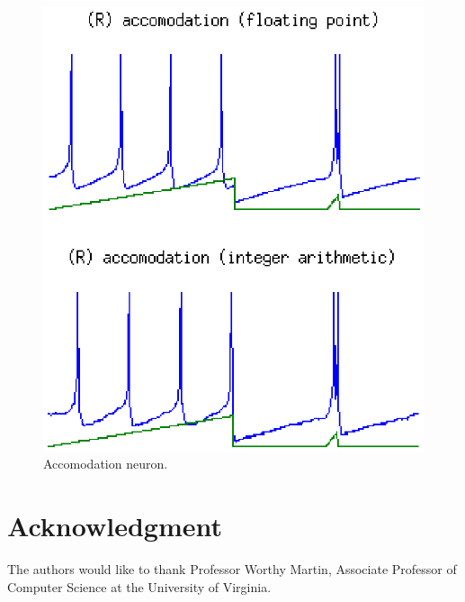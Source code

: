 \documentclass[journal]{./sty/IEEEtran}
\begin{document}
\begin{figure}
\centering
\includegraphics[scale=0.6]{imgs/izh_accomodation}
\caption{Accomodation neuron.\label{fig:accomod8}}
\end{figure}


\section*{Acknowledgment}


The authors would like to thank Professor Worthy Martin, Associate Professor of Computer Science at the University of Virginia.


\ifCLASSOPTIONcaptionsoff
  \newpage
\fi



\end{document}
